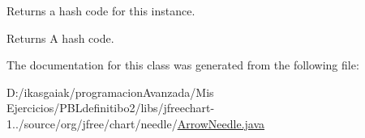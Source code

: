 Returns a hash code for this instance.

\begin{DoxyReturn}{Returns}
A hash code. 
\end{DoxyReturn}


The documentation for this class was generated from the following file\+:\begin{DoxyCompactItemize}
\item 
D\+:/ikasgaiak/programacion\+Avanzada/\+Mis Ejercicios/\+P\+B\+Ldefinitibo2/libs/jfreechart-\/1../source/org/jfree/chart/needle/\mbox{\hyperlink{_arrow_needle_8java}{Arrow\+Needle.\+java}}\end{DoxyCompactItemize}
